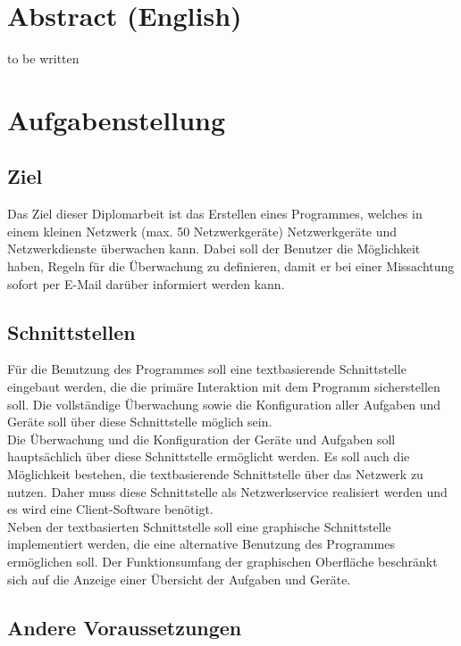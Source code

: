 \documentclass[12pt,a4paper]{report}
\begin{document}
\begin{onehalfspace}
\chapter{Abstract (English)}
to be written

\chapter{Aufgabenstellung}

\section{Ziel}

Das Ziel dieser Diplomarbeit ist das Erstellen eines Programmes, welches in einem kleinen Netzwerk (max. 50 Netzwerkgeräte) Netzwerkgeräte und Netzwerkdienste überwachen kann. Dabei soll der Benutzer die Möglichkeit haben, Regeln für die Überwachung zu definieren, damit er bei einer Missachtung sofort per E-Mail darüber informiert werden kann.


\section{Schnittstellen}

Für die Benutzung des Programmes soll eine textbasierende Schnittstelle eingebaut werden, die die primäre Interaktion mit dem Programm sicherstellen soll. Die vollständige Überwachung sowie die Konfiguration aller Aufgaben und Geräte soll über diese Schnittstelle möglich sein.\\
Die Überwachung und die Konfiguration der Geräte und Aufgaben soll hauptsächlich über diese Schnittstelle ermöglicht werden.
Es soll auch die Möglichkeit bestehen, die textbasierende Schnittstelle über das Netzwerk zu nutzen. Daher muss diese Schnittstelle als Netzwerkservice realisiert werden und es wird eine Client-Software benötigt.\\

Neben der textbasierten Schnittstelle soll eine graphische Schnittstelle implementiert werden, die eine alternative Benutzung des Programmes ermöglichen soll. Der Funktionsumfang der graphischen Oberfläche beschränkt sich auf die Anzeige einer Übersicht der Aufgaben und Geräte.

\section{Andere Voraussetzungen}


\end{onehalfspace}
\end{document}

